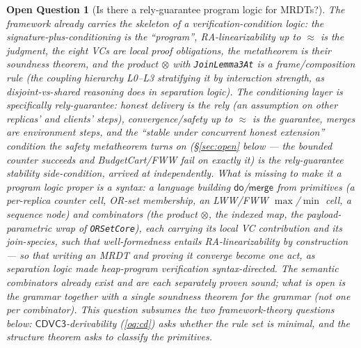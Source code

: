 \documentclass[11pt]{article}
\newtheorem{openq}[theorem]{Open Question}
\newcommand{\cd}{\mathsf{CDVC3}}
\newcommand{\lean}[1]{\texttt{#1}}
\newcommand{\dodo}{\mathsf{do}}
\newcommand{\merge}{\mathsf{merge}}
\newcommand{\eqobs}{\approx}
\begin{document}
\begin{openq}[Is there a rely-guarantee program logic for MRDTs?]
\label{oq:proglogic}
The framework already carries the skeleton of a verification-condition logic:
the signature-plus-conditioning is the ``program'', RA-linearizability up to
$\eqobs$ is the judgment, the eight VCs are local proof obligations, the
metatheorem is their \emph{soundness theorem}, and the product $\otimes$ with
\lean{JoinLemma3At} is a frame/composition rule (the coupling hierarchy
L0--L3 stratifying it by interaction strength, as disjoint-vs-shared
reasoning does in separation logic). The conditioning layer is specifically
\emph{rely-guarantee}: honest delivery is the \emph{rely} (an assumption on
other replicas' and clients' steps), convergence/safety up to $\eqobs$ is the
\emph{guarantee}, merges are environment steps, and the ``stable under
concurrent honest extension'' condition the safety metatheorem turns on
(\S\ref{sec:open} below --- the bounded counter succeeds and
BudgetCart/FWW fail on exactly it) \emph{is} the rely-guarantee stability
side-condition, arrived at independently. What is missing to make it a
program logic proper is a \emph{syntax}: a language building $\dodo$/$\merge$
from primitives (a per-replica counter cell, OR-set membership, an LWW/FWW
$\max$/$\min$ cell, a sequence node) and combinators (the product $\otimes$,
the indexed map, the payload-parametric wrap of \lean{ORSetCore}), each
carrying its local VC contribution and its join-species, such that
well-formedness entails RA-linearizability \emph{by construction} --- so that
writing an MRDT and proving it converge become one act, as separation logic
made heap-program verification syntax-directed. The \emph{semantic}
combinators already exist and are each \emph{separately} proven sound; what
is open is the grammar together with a \emph{single} soundness theorem for
the grammar (not one per combinator). This question subsumes the two
framework-theory questions below: $\cd$-derivability (\ref{oq:cd}) asks
whether the rule set is minimal, and the structure theorem asks to classify
the primitives.
\end{openq}
\end{document}
